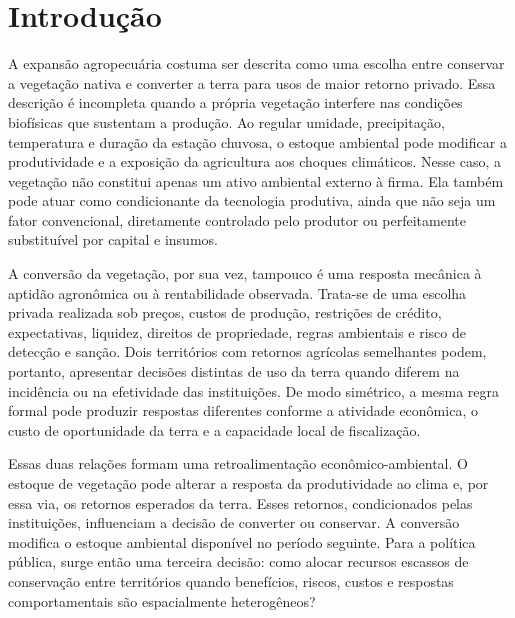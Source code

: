 
\section{Introdução}
\label{sec:introducao}

A expansão agropecuária costuma ser descrita como uma escolha entre conservar a vegetação nativa e converter a terra para usos de maior retorno privado. Essa descrição é incompleta quando a própria vegetação interfere nas condições biofísicas que sustentam a produção. Ao regular umidade, precipitação, temperatura e duração da estação chuvosa, o estoque ambiental pode modificar a produtividade e a exposição da agricultura aos choques climáticos. Nesse caso, a vegetação não constitui apenas um ativo ambiental externo à firma. Ela também pode atuar como condicionante da tecnologia produtiva, ainda que não seja um fator convencional, diretamente controlado pelo produtor ou perfeitamente substituível por capital e insumos.

A conversão da vegetação, por sua vez, tampouco é uma resposta mecânica à aptidão agronômica ou à rentabilidade observada. Trata-se de uma escolha privada realizada sob preços, custos de produção, restrições de crédito, expectativas, liquidez, direitos de propriedade, regras ambientais e risco de detecção e sanção. Dois territórios com retornos agrícolas semelhantes podem, portanto, apresentar decisões distintas de uso da terra quando diferem na incidência ou na efetividade das instituições. De modo simétrico, a mesma regra formal pode produzir respostas diferentes conforme a atividade econômica, o custo de oportunidade da terra e a capacidade local de fiscalização.

Essas duas relações formam uma retroalimentação econômico-ambiental. O estoque de vegetação pode alterar a resposta da produtividade ao clima e, por essa via, os retornos esperados da terra. Esses retornos, condicionados pelas instituições, influenciam a decisão de converter ou conservar. A conversão modifica o estoque ambiental disponível no período seguinte. Para a política pública, surge então uma terceira decisão: como alocar recursos escassos de conservação entre territórios quando benefícios, riscos, custos e respostas comportamentais são espacialmente heterogêneos?

